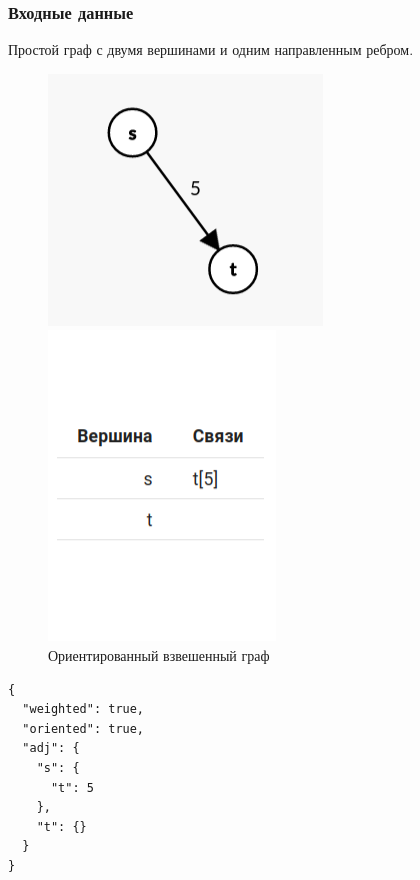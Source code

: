 \subsubsection{Входные данные}
Простой граф с двумя вершинами и одним направленным ребром.
\begin{figure}[H]
  \begin{minipage}{0.5\textwidth}
    \centering\includegraphics[width=0.6\linewidth]{figs/task-11/graph-ff-1.png}
  \end{minipage}
  \begin{minipage}{0.5\textwidth}
    \centering\includegraphics[width=0.6\linewidth]{figs/task-11/adj-ff-1.png}
  \end{minipage}
  \caption{Ориентированный взвешенный граф}
\end{figure}

\begin{verbatim}
{
  "weighted": true,
  "oriented": true,
  "adj": {
    "s": {
      "t": 5
    },
    "t": {}
  }
}
\end{verbatim}

